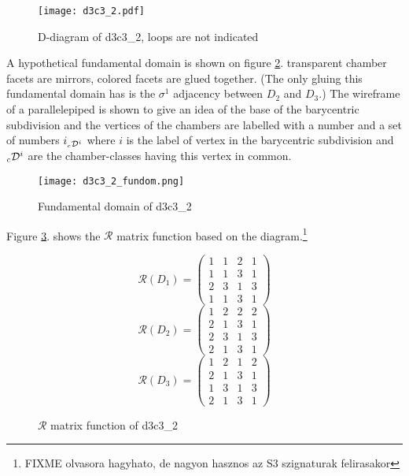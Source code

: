 \documentclass[12pt,a4paper]{article}
\numberwithin{equation}{section}
\newcommand{\leftsub}[2]{{\vphantom{#2}}_{#1}{#2}}
\theoremstyle{plain}%
\theoremstyle{definition}
\theoremstyle{remark}
\begin{document}
\begin{figure}
  \caption{\label{fig:d3c3_2} D-diagram of d3c3\_2, loops are not indicated}
  \center
  \texttt{[image: d3c3\_2.pdf]}
\end{figure}

A hypothetical fundamental domain is shown on figure \ref{fig:d3c3_2_fundom}.
transparent chamber facets are mirrors, colored facets are glued together. (The
only gluing this fundamental domain has is the $\sigma^1$ adjacency between
$D_2$ and $D_3$.) The wireframe of a parallelepiped is shown to give an idea of
the base of the barycentric subdivision and the vertices of the chambers are
labelled with a number and a set of numbers $i_{\leftsub{c}{\mathcal{D}}^i}$
where $i$ is the label of vertex in the barycentric subdivision and
$\leftsub{c}{\mathcal{D}}^i$ are the chamber-classes having this vertex in
common.

\begin{figure}
  \caption{\label{fig:d3c3_2_fundom} Fundamental domain of d3c3\_2}
  \center
  \texttt{[image: d3c3\_2\_fundom.png]}
\end{figure}

Figure \ref{fig:d3c3_2_r}. shows the $\mathcal{R}$ matrix function based on the
diagram.\footnote{FIXME olvasora hagyhato, de nagyon hasznos az S3 szignaturak
felirasakor}

\begin{figure}
  \caption{\label{fig:d3c3_2_r} $\mathcal{R}$ matrix function of d3c3\_2}
  \begin{equation*}
    \mathcal{R}(D_1)=
    \left(
    \begin{array}{cccc}
      1 & 1 & 2 & 1\\
      1 & 1 & 3 & 1\\
      2 & 3 & 1 & 3\\
      1 & 1 & 3 & 1
    \end{array}
    \right)
  \end{equation*}
  \begin{equation*}
    \mathcal{R}(D_2)=
    \left(
    \begin{array}{cccc}
      1 & 2 & 2 & 2\\
      2 & 1 & 3 & 1\\
      2 & 3 & 1 & 3\\
      2 & 1 & 3 & 1
    \end{array}
    \right)
  \end{equation*}
  \begin{equation*}
    \mathcal{R}(D_3)=
    \left(
    \begin{array}{cccc}
      1 & 2 & 1 & 2\\
      2 & 1 & 3 & 1\\
      1 & 3 & 1 & 3\\
      2 & 1 & 3 & 1
    \end{array}
    \right)
  \end{equation*}
\end{figure}
\end{document}
